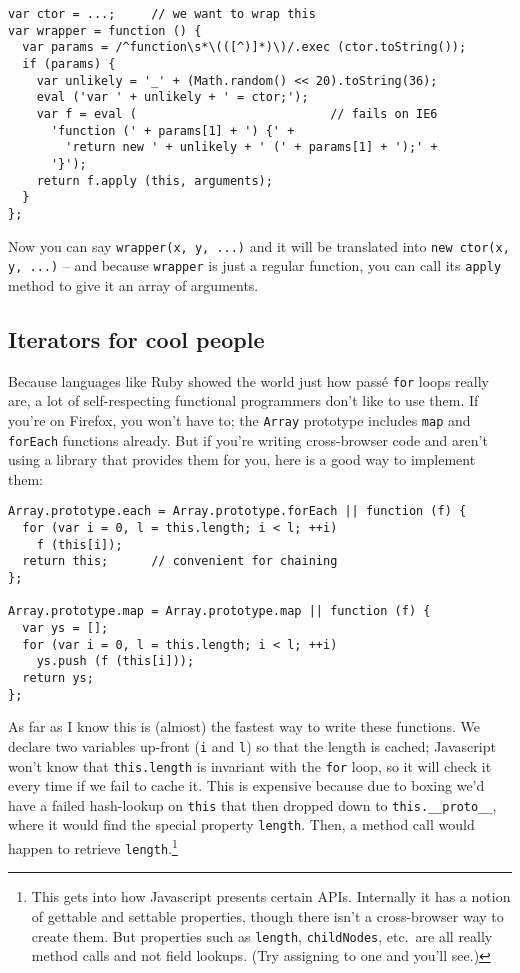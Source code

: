 \documentclass{article}
\begin{document}
\begin{verbatim}
var ctor = ...;     // we want to wrap this
var wrapper = function () {
  var params = /^function\s*\(([^)]*)\)/.exec (ctor.toString());
  if (params) {
    var unlikely = '_' + (Math.random() << 20).toString(36);
    eval ('var ' + unlikely + ' = ctor;');
    var f = eval (                           // fails on IE6
      'function (' + params[1] + ') {' +
        'return new ' + unlikely + ' (' + params[1] + ');' +
      '}');
    return f.apply (this, arguments);
  }
};
\end{verbatim}

    Now you can say {\tt wrapper(x, y, ...)} and it will be translated into {\tt new ctor(x, y, ...)} -- and because {\tt wrapper} is just a regular function, you can call its {\tt apply}
    method to give it an array of arguments.

\subsection {Iterators for cool people}
    Because languages like Ruby showed the world just how pass\'e \verb|for| loops really are, a lot of self-respecting functional programmers don't like to use them. If you're on Firefox, you
    won't have to; the \verb|Array| prototype includes \verb|map| and \verb|forEach| functions already. But if you're writing cross-browser code and aren't using a library that provides them
    for you, here is a good way to implement them:

\begin{verbatim}
Array.prototype.each = Array.prototype.forEach || function (f) {
  for (var i = 0, l = this.length; i < l; ++i)
    f (this[i]);
  return this;      // convenient for chaining
};

Array.prototype.map = Array.prototype.map || function (f) {
  var ys = [];
  for (var i = 0, l = this.length; i < l; ++i)
    ys.push (f (this[i]));
  return ys;
};
\end{verbatim}

    As far as I know this is (almost) the fastest way to write these functions. We declare two variables up-front (\verb|i| and \verb|l|) so that the length is cached; Javascript won't know
    that \verb|this.length| is invariant with the \verb|for| loop, so it will check it every time if we fail to cache it. This is expensive because due to boxing we'd have a failed hash-lookup
    on \verb|this| that then dropped down to \verb|this.__proto__|, where it would find the special property \verb|length|. Then, a method call would happen to retrieve
    \verb|length|.\footnote{This gets into how Javascript presents certain APIs. Internally it has a notion of gettable and settable properties, though there isn't a cross-browser way to
    create them. But properties such as {\tt length}, {\tt childNodes}, etc.~are all really method calls and not field lookups. (Try assigning to one and you'll see.)}
\end{document}
